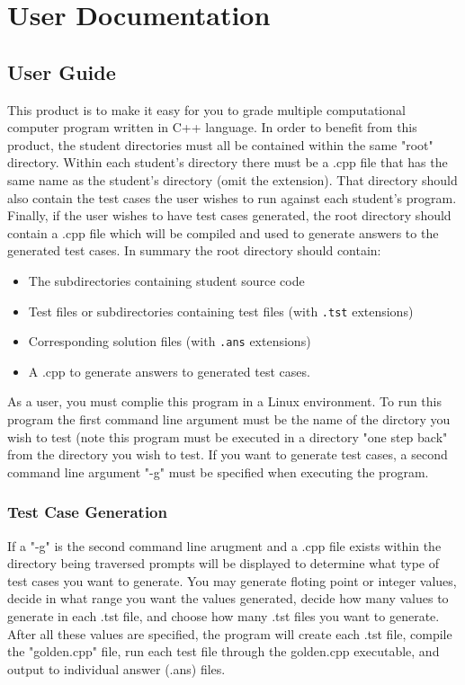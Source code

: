 
\chapter{User Documentation}


\section{User Guide}

This product is to make it easy for you to grade multiple computational computer program written in C++ language. In order to benefit from this product, the student directories must all be contained within the same "root" directory.
Within each student's directory there must be a .cpp file that has the same name as the student's directory (omit the extension). That directory should also contain the test cases the user wishes to run against each student's program.
Finally, if the user wishes to have test cases generated, the root directory should contain a .cpp file which will be compiled and used to generate answers to the generated test cases. In summary the root directory should contain:
    \begin{itemize}
  		\item The subdirectories containing student source code
  		\item Test files or subdirectories containing test files (with {\tt .tst} extensions)
  		\item Corresponding solution files (with {\tt .ans} extensions)
        \item A .cpp to generate answers to generated test cases. 
	\end{itemize} 

As a user, you must complie this program in a Linux environment. To run this program the first command line argument must be the name of the dirctory you wish to test (note this program must be executed in a directory "one step back" from the directory you wish to test. If you want to generate test cases, a second command line argument "-g" must be specified when executing the program. 

\subsection {Test Case Generation}
If a "-g" is the second command line arugment and a .cpp file exists within the directory being traversed prompts will be displayed to determine what type of test cases you want to generate. You may generate floting point or integer values, decide in what range you want the values generated, decide how many values to generate in each .tst file, and choose how many .tst files you want to generate. After all these values are specified, the program will create each .tst file, compile the "golden.cpp" file, run each test file through the golden.cpp executable, and output to individual answer (.ans) files.
